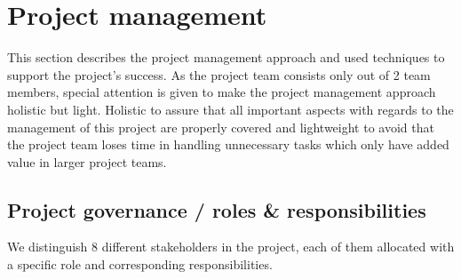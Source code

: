 \section{Project management}
\label{sec:project-management}
This section describes the project management approach and used techniques to support the project's success.
As the project team consists only out of 2 team members, special attention is given to make the project management approach holistic but light.
Holistic to assure that all important aspects with regards to the management of this project are properly covered and lightweight to avoid that the project team loses time in handling unnecessary tasks which only have added value in larger project teams.

\subsection{Project governance / roles \& responsibilities}
We distinguish 8 different stakeholders in the project, each of them allocated with a specific role and corresponding responsibilities.
